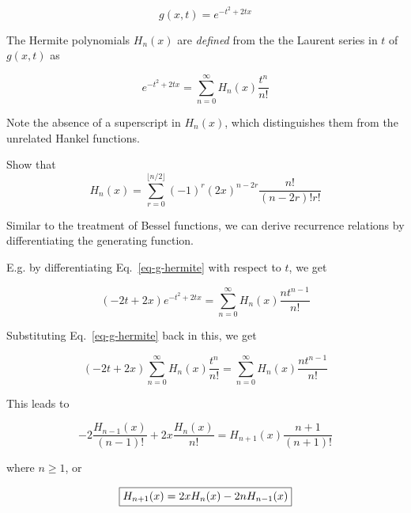 \begin{equation}
g(x,t) = e^{-t^2 + 2tx} \label{eq-gen-hermite}
\end{equation}

The Hermite polynomials $H_n(x)$ are \emph{defined} from the the Laurent series in $t$ of $g(x,t)$ as 

\begin{equation}
e^{-t^2 + 2tx}= \sum_{n = 0}^{\infty} H_n(x)\frac{t^n}{n!} \label{eq-g-hermite}
\end{equation} 

Note the absence of a superscript in $H_n(x)$, which distinguishes them from the unrelated Hankel functions.

\begin{sidebar}
\begin{ex}
Show that
$$H_n(x) = \sum_{r=0}^{\lfloor n/2 \rfloor}(-1)^r {(2x)}^{n-2r} \frac{n!}{(n-2r)! r!}$$
\end{ex}
\end{sidebar}


Similar to the treatment of Bessel functions, we can derive recurrence relations by differentiating the generating function.

E.g. by differentiating Eq.~\ref{eq-g-hermite} with respect to $t$, we get

\begin{equation}
(-2t+2x)e^{-t^2 + 2tx} = \sum_{n = 0}^{\infty} H_n(x) \frac{nt^{n-1}}{n!}
\end{equation} 

Substituting Eq.~\ref{eq-g-hermite} back in this, we get

\begin{equation}
(-2t+2x) \sum_{n = 0}^{\infty} H_n(x)\frac{t^n}{n!} = \sum_{n = 0}^{\infty} H_n(x) \frac{nt^{n-1}}{n!}
\end{equation} 

This leads to

\begin{equation}
-2  \frac{H_{n-1}(x)}{(n-1)!} + 2 x \frac{H_n(x)}{n!} = H_{n+1}(x) \frac{n+1}{(n+1)!}
\end{equation} 

where $n \geq 1$, or

\begin{equation}
\fbox{$\displaystyle
H_{n+1}(x) = 2 x H_n(x) - 2 n H_{n-1}(x)
$} \label{eq-recur-hermite-1}
\end{equation} 

